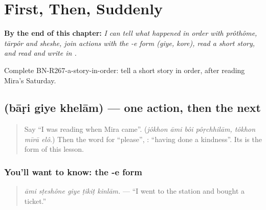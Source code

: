 
\chapter{First, Then, Suddenly}
\label{ch:bn-first-then-suddenly}

\begin{chapteropening}
\textbf{By the end of this chapter:} \emph{I can tell what happened in order with prôthôme, tārpôr and sheshe, join actions with the -e form (giye, kore), read a short story, and read and write  in .}

Complete BN-R267-a-story-in-order: tell a short story in order, after reading Mira's Saturday.
\end{chapteropening}

\section[\texorpdfstring{\bn{বাড়ি} \bn{গিয়ে} \bn{খেলাম} (bāṛi giye khelām)}{বাড়ি গিয়ে খেলাম (bāṛi giye khelām)}]{   (bāṛi giye khelām) — one action, then the next}

\label{lesson:BN-C267-giye}



\begin{quote}
Say \textquotedblleft{}I was reading when Mira came\textquotedblright{}. (\emph{jôkhon āmi bôi pôṛchhilām, tôkhon mīrā elô}.) Then the word for \textquotedblleft{}please\textquotedblright{}, \textbf{ }: \textquotedblleft{}having done a kindness\textquotedblright{}. Its \textbf{} is the form of this lesson.
\end{quote}

\subsection*{You'll want to know: the -e form}
\begin{quote}
\textbf{    }
\end{quote}

\begin{quote}
\emph{āmi sṭeshône giye ṭikiṭ kinlām.} — \textquotedblleft{}I went to the station and bought a ticket.\textquotedblright{}
\end{quote}


